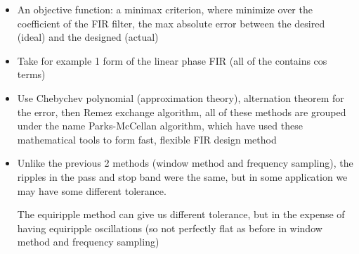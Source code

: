 \begin{itemize}
    \item An objective function: a minimax criterion, where minimize over the coefficient of the FIR filter, the max absolute error between the desired (ideal) and the designed (actual)
    
    \item Take for example 1 form of the linear phase FIR (all of the contains cos terms)
    
    \item Use Chebychev polynomial (approximation theory), alternation theorem for the error, then Remez exchange algorithm, all of these methods are grouped under the name Parks-McCellan algorithm, which have used these mathematical tools to form fast, flexible FIR design method
    
    \item Unlike the previous 2 methods (window method and frequency sampling), the ripples in the pass and stop band were the same, but in some application we may have some different tolerance.
    
    The equiripple method can give us different tolerance, but in the expense of having equiripple oscillations (so not perfectly flat as before in window method and frequency sampling)
    
    
\end{itemize}